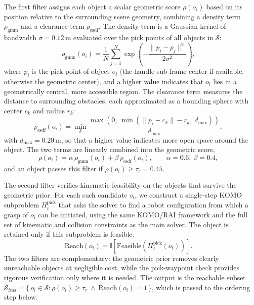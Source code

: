 \documentclass[journal]{IEEEtran}
\begin{document}
The first filter assigns each object a scalar geometric score $\rho(o_i)$
based on its position relative to the surrounding scene geometry, combining a
density term $\rho_{\mathrm{gmm}}$ and a clearance term $\rho_{\mathrm{esdf}}$.
The density term is a Gaussian kernel of bandwidth $\sigma = 0.12\,\mathrm{m}$
evaluated over the pick points of all objects in $\mathcal{S}$:
\begin{equation}
  \rho_{\mathrm{gmm}}(o_i) = \frac{1}{N} \sum_{j=1}^{N}
    \exp\!\left(-\frac{\|p_i - p_j\|^2}{2\sigma^2}\right),
  \label{eq:reach_gmm}
\end{equation}
where $p_i$ is the pick point of object $o_i$ (the handle sub-frame center
if available, otherwise the geometric center), and a higher value indicates
that $o_i$ lies in a geometrically central, more accessible region. The
clearance term measures the distance to surrounding obstacles, each
approximated as a bounding sphere with center $c_k$ and radius $r_k$:
\begin{equation}
  \rho_{\mathrm{esdf}}(o_i) = \min_k \frac{\max\!\left(0,\ \min\!\left(\|p_i - c_k\| - r_k,\ d_{\max}\right)\right)}{d_{\max}},
  \label{eq:reach_esdf}
\end{equation}
with $d_{\max} = 0.20\,\mathrm{m}$, so that a higher value indicates more
open space around the object. The two terms are linearly combined into the
geometric score,
\begin{equation}
  \rho(o_i) = \alpha \, \rho_{\mathrm{gmm}}(o_i) + \beta \, \rho_{\mathrm{esdf}}(o_i),
  \qquad \alpha = 0.6,\ \beta = 0.4,
  \label{eq:reach_fused}
\end{equation}
and an object passes this filter if $\rho(o_i) \geq \tau_r = 0.45$.

The second filter verifies kinematic feasibility on the objects that survive
the geometric prior. For each such candidate $o_i$, we construct a
single-step KOMO subproblem $\Pi_i^{\mathrm{pick}}$ that asks the solver to
find a robot configuration from which a grasp of $o_i$ can be initiated,
using the same KOMO/RAI framework and the full set of kinematic and
collision constraints as the main solver. The object is retained only if
this subproblem is feasible:
\begin{equation}
  \mathrm{Reach}(o_i) =
  \mathbb{I}\!\left[\mathrm{Feasible}\!\left(\Pi_i^{\mathrm{pick}}(o_i)\right)\right].
  \label{eq:reach_check}
\end{equation}
The two filters are complementary: the geometric prior removes clearly
unreachable objects at negligible cost, while the pick-waypoint check
provides rigorous verification only where it is needed. The output is the
reachable subset
$\mathcal{S}_{\mathrm{feas}} = \{\, o_i \in \mathcal{S} : \rho(o_i)\ge\tau_r \ \wedge\ \mathrm{Reach}(o_i)=1 \,\}$,
which is passed to the ordering step below.
\end{document}
